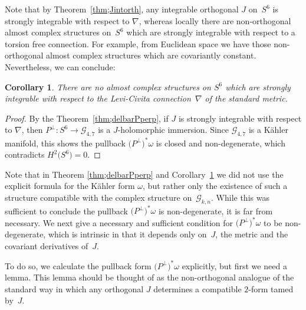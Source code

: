\documentclass[10pt,a4paper]{amsart}
\newtheorem{cor}[thm]{Corollary}
\numberwithin{equation}{section}
\newcommand{\cG}{{\mathcal G}}
\begin{document}
Note that by Theorem~\ref{thm;Jintorth}, any integrable orthogonal $J$ on~$S^6$ is strongly integrable with respect to $\nabla$, whereas locally there are non-orthogonal almost complex structures on~$S^6$ which are strongly integrable with respect to a torsion free connection. For example, from Euclidean space we have those non-orthogonal almost complex structures which are covariantly constant. Nevertheless, we can conclude:


\begin{cor} \label{cor;noStrongJ}There are no almost complex structures on $S^6$ which are strongly integrable with respect to the Levi-Civita connection~$\nabla$ of the standard metric.
\end{cor}



\begin{proof} By the Theorem~\ref{thm;delbarPperp}, if $J$ is strongly integrable with respect to $\nabla$, then $P^\perp\colon S^6 \to \cG_{4,7}$ is a $J$-holomorphic immersion. Since $\cG_{4,7}$ is a K\"ahler manifold, this shows the pullback $\big(P^\perp \big)^*\omega$ is closed and non-degenerate, which contradicts $H^2\big(S^6\big) =0$.
\end{proof}


Note that in Theorem \ref{thm;delbarPperp} and Corollary~\ref{cor;noStrongJ} we did not use the explicit formula for the K\"ahler form $\omega$, but rather only the existence of such a structure compatible with the complex structure on~$\cG_{k,n}$. While this was sufficient to conclude the pullback $\big(P^\perp\big)^*\omega$ is non-degenerate, it is far from necessary. We next give a necessary and sufficient condition for $\big(P^\perp\big)^*\omega$ to be non-degenerate, which is intrinsic in that it depends only on~$J$, the metric and the covariant derivatives of~$J$.

To do so, we calculate the pullback form $\big(P^\perp\big)^*\omega$ explicitly, but first we need a lemma. This lemma should be thought of as the non-orthogonal analogue of the standard way in which any orthogonal $J$ determines a compatible $2$-form tamed by~$J$.
\end{document}
